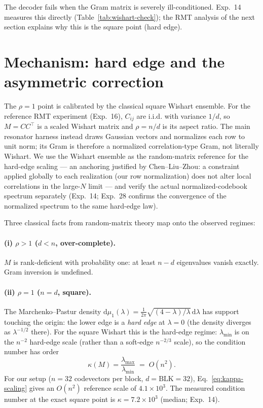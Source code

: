 \documentclass[11pt,a4paper]{article}
\begin{document}
The decoder fails when the Gram matrix is severely ill-conditioned. Exp.~14 measures this directly (Table~\ref{tab:wishart-check}); the RMT analysis of the next section explains why this is the square point (hard edge).

\section{Mechanism: hard edge and the asymmetric correction}
\label{sec:rmt}

The $\rho=1$ point is calibrated by the classical square Wishart ensemble. For the reference RMT experiment (Exp.~16), $C_{ij}$ are i.i.d. with variance $1/d$, so $M=CC^{\top}$ is a scaled Wishart matrix and $\rho=n/d$ is its aspect ratio. The main resonator harness instead draws Gaussian vectors and normalizes each row to unit norm; its Gram is therefore a normalized correlation-type Gram, not literally Wishart. We use the Wishart ensemble as the random-matrix reference for the hard-edge scaling \citep{johnstone2001distribution} --- an anchoring justified by Chen--Liu--Zhou: a constraint applied globally to each realization (our row normalization) does not alter local correlations in the large-$N$ limit \citep{chen2010smallest} --- and verify the actual normalized-codebook spectrum separately (Exp.~14; Exp.~28 confirms the convergence of the normalized spectrum to the same hard-edge law).

Three classical facts from random-matrix theory map onto the observed regimes:

\paragraph{(i) $\rho > 1$ ($d < n$, over-complete).} $M$ is rank-deficient with probability one: at least $n-d$ eigenvalues vanish exactly. Gram inversion is undefined.

\paragraph{(ii) $\rho = 1$ ($n = d$, square).} The Marchenko--Pastur density $\mathrm{d}\mu_{1}(\lambda) = \frac{1}{2\pi}\sqrt{(4-\lambda)/\lambda}\,\mathrm{d}\lambda$ has support touching the origin: the lower edge is a \emph{hard edge} at $\lambda=0$ (the density diverges as $\lambda^{-1/2}$ there). For the square Wishart this is the hard-edge regime: $\lambda_{\min}$ is on the $n^{-2}$ hard-edge scale (rather than a soft-edge $n^{-2/3}$ scale), so the condition number has order
\begin{equation}
\kappa(M) = \frac{\lambda_{\max}}{\lambda_{\min}} \;=\; O(n^{2}).
\label{eq:kappa-scaling}
\end{equation}
For our setup ($n = 32$ codevectors per block, $d = \mathrm{BLK} = 32$), Eq.~\eqref{eq:kappa-scaling} gives an $O(n^2)$ reference scale of $4.1 \times 10^{3}$. The measured condition number at the exact square point is $\kappa = 7.2 \times 10^{3}$ (median; Exp.~14).
\end{document}
